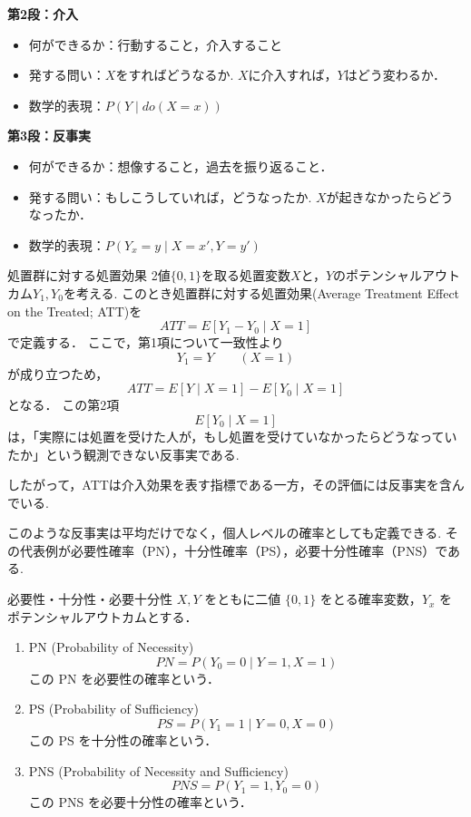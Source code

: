 \documentclass[uplatex, dvipdfmx]{jsarticle}
\begin{document}
\noindent\textbf{第2段：介入}
\begin{itemize}
    \item 何ができるか：行動すること，介入すること
    \item 発する問い：$X$をすればどうなるか. $X$に介入すれば，$Y$はどう変わるか．
    \item 数学的表現：$P(Y \mid do(X=x))$
\end{itemize}

\noindent\textbf{第3段：反事実}
\begin{itemize}
    \item 何ができるか：想像すること，過去を振り返ること．
    \item 発する問い：もしこうしていれば，どうなったか. $X$が起きなかったらどうなったか．
    \item 数学的表現：$P(Y_x=y \mid X=x', Y=y')$
\end{itemize}

\begin{exm}{処置群に対する処置効果}
2値$\{0,1\}$を取る処置変数$X$と，$Y$のポテンシャルアウトカム$Y_1,Y_0$を考える.
このとき処置群に対する処置効果(Average Treatment Effect on the Treated; ATT)を
\[
  ATT=E[Y_1-Y_0 \mid X=1]
\]
で定義する．
ここで，第1項について一致性より
\[
  Y_1=Y \qquad (X=1)
\]
が成り立つため，
\[ 
  ATT=E[Y \mid X=1] - E[Y_0 \mid X=1]
\]
となる．
この第2項
\[
  E[Y_0\mid X=1]
\]
は，「実際には処置を受けた人が，もし処置を受けていなかったらどうなっていたか」という観測できない反事実である.

したがって，ATTは介入効果を表す指標である一方，その評価には反事実を含んでいる.
\end{exm}

このような反事実は平均だけでなく，個人レベルの確率としても定義できる.
その代表例が必要性確率（PN），十分性確率（PS），必要十分性確率（PNS）である.

\begin{defn}{必要性・十分性・必要十分性}
  $X, Y$ をともに二値 $\{0, 1\}$ をとる確率変数，$Y_x$ をポテンシャルアウトカムとする．
  \begin{enumerate}[label={(\roman*)}, leftmargin=*]
  \item PN (Probability of Necessity)
  \begin{equation}
    PN = P(Y_0=0 \mid Y=1, X=1)
  \end{equation}
  この PN を必要性の確率という．
  \item PS (Probability of Sufficiency)
  \begin{equation}
    PS = P(Y_1=1 \mid Y=0, X=0)
  \end{equation}
  この PS を十分性の確率という．
  \item PNS (Probability of Necessity and Sufficiency)
  \begin{equation}
    PNS = P(Y_1=1, Y_0=0)
  \end{equation}
  この PNS を必要十分性の確率という． 
  \end{enumerate}
\end{defn}
\end{document}
